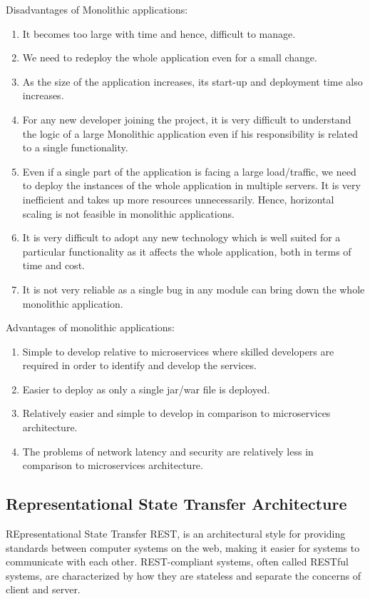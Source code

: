 Disadvantages of Monolithic applications:
\begin{enumerate}
      \item
      It becomes too large with time and hence, difficult to manage.
      \item
      We need to redeploy the whole application even for a small change.
      \item
      As the size of the application increases, its start-up and deployment time also increases.
      \item
      For any new developer joining the project, it is very difficult to understand the logic of a large Monolithic application even if his responsibility is related to a single functionality.
      \item
      Even if a single part of the application is facing a large load/traffic, we need to deploy the instances of the whole application in multiple servers. It is very inefficient and takes up more resources unnecessarily. Hence, horizontal scaling is not feasible in monolithic applications.
      \item
      It is very difficult to adopt any new technology which is well suited for a particular functionality as it affects the whole application, both in terms of time and cost.
      \item
      It is not very reliable as a single bug in any module can bring down the whole monolithic application.
\end{enumerate}
Advantages of monolithic applications:
\begin{enumerate}
      \item
      Simple to develop relative to microservices where skilled developers are required in order to identify and develop the services.
      \item
      Easier to deploy as only a single jar/war file is deployed.
      \item
            Relatively easier and simple to develop in comparison to microservices architecture.
            \item
            The problems of network latency and security are relatively less in comparison to microservices architecture.
      \end{enumerate}

      \subsection{Representational State Transfer Architecture}
REpresentational State Transfer \ac{REST}, is an architectural style for providing standards between computer systems on the web, making it easier for systems to communicate with each other. REST-compliant systems, often called RESTful systems, are characterized by how they are stateless and separate the concerns of client and server.

